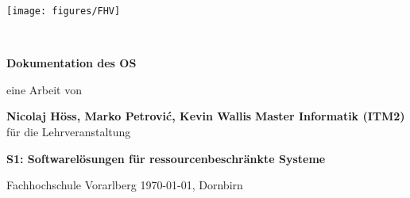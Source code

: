 \documentclass[11pt]{scrartcl}
\title{\mytitle}
\author{\myauthor}
\date{\today{}, Dornbirn}
\newcommand{\myauthor}{Nicolaj Höss, Marko Petrovi\'c, Kevin Wallis}
\newcommand{\mytitle}{Dokumentation des OS}
\newcommand{\myuniversity}{Fachhochschule Vorarlberg}
\newcommand{\mycourse}{S1: Softwarelösungen für ressourcenbeschränkte Systeme}
\newcommand{\mystudy}{Master Informatik (ITM2)}
\newcommand{\mydate}{\today{}, Dornbirn}
\begin{document}
\begin{titlepage}

\begin{minipage}{.5\textwidth} 
  \hspace{12cm}\hfill \texttt{[image: figures/FHV]} 
\end{minipage}\vspace{2cm} 

\begin{center}
~
\vfill\vfill\vfill

{\Huge\bfseries\mytitle}

\vfill

\Large{eine Arbeit von}

\vfill

{\LARGE\bfseries\myauthor}
\vfill
{\Large\bfseries\mystudy}
\vfill
\vfill
\Large{für die Lehrveranstaltung}

\vfill

{\LARGE\bfseries\mycourse}

\vfill\vfill\vfill
\vfill\vfill\vfill
\vfill\vfill\vfill

\myuniversity
\vfill
\mydate
\end{center}
\end{titlepage}



\thispagestyle{plain}
\tableofcontents

\listoffigures

\pagebreak









\clearpage
{}
{}

\end{document}
